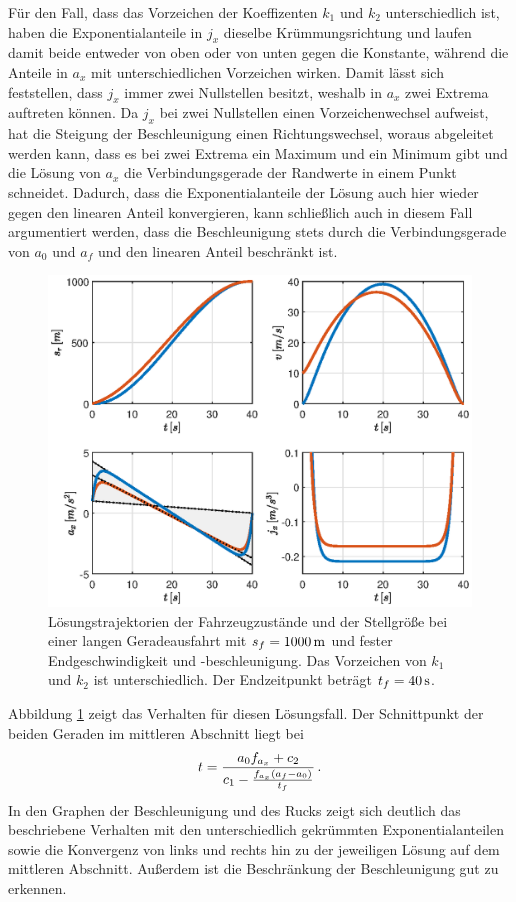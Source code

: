 Für den Fall, dass das Vorzeichen der Koeffizenten $k_1$ und $k_2$ unterschiedlich ist, haben die Exponentialanteile in $j_x$ dieselbe Krümmungsrichtung und laufen damit beide entweder von oben oder von unten gegen die Konstante, während die Anteile in $a_x$ mit unterschiedlichen Vorzeichen wirken. Damit lässt sich feststellen, dass $j_x$ immer zwei Nullstellen besitzt, weshalb in $a_x$ zwei Extrema auftreten können. Da $j_x$ bei zwei Nullstellen einen Vorzeichenwechsel aufweist, hat die Steigung der Beschleunigung einen Richtungswechsel, woraus abgeleitet werden kann, dass es bei zwei Extrema ein Maximum und ein Minimum gibt und die Lösung von $a_x$ die Verbindungsgerade der Randwerte in einem Punkt schneidet. Dadurch, dass die Exponentialanteile der Lösung auch hier wieder gegen den linearen Anteil konvergieren, kann schließlich auch in diesem Fall argumentiert werden, dass die Beschleunigung stets durch die Verbindungsgerade von $a_0$ und $a_f$ und den linearen Anteil beschränkt ist. 
\begin{figure}[h] 
	\centering
	\includegraphics[width=0.95\linewidth]{./Bilder/Ergebnisse/Geradeausfahrt/vf_af_fest_unterschiedliches_VZ.eps}
	\caption{Lösungstrajektorien der Fahrzeugzustände und der Stellgröße bei einer langen Geradeausfahrt mit $s_f=1000\,\mathrm{m}$ und fester Endgeschwindigkeit und -beschleunigung. Das Vorzeichen von $k_1$ und $k_2$ ist unterschiedlich. Der Endzeitpunkt beträgt $t_f = 40\,\mathrm{s}$.}
	\label{fig:vf_af_fest_unterschiedliches_VZ}
\end{figure}
Abbildung \ref{fig:vf_af_fest_unterschiedliches_VZ} zeigt das Verhalten für diesen Lösungsfall. Der Schnittpunkt der beiden Geraden im mittleren Abschnitt liegt bei 
\begin{equation}
t = \frac{a_0f_{a_x} + c_2}{c_1 - \frac{f_{a_x}(a_f - a_0)}{t_f}} \,.
\end{equation} 
In den Graphen der Beschleunigung und des Rucks zeigt sich deutlich das beschriebene Verhalten mit den unterschiedlich gekrümmten Exponentialanteilen sowie die Konvergenz von links und rechts hin zu der jeweiligen Lösung auf dem mittleren Abschnitt. Außerdem ist die Beschränkung der Beschleunigung gut zu erkennen. 


